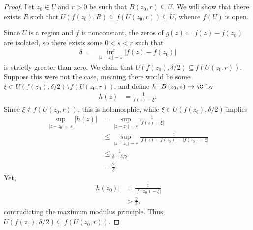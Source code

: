 \documentclass[10pt]{mypackage}
\begin{document}
\begin{proof}
  Let $z_0\in U$ and $r > 0$ be such that $ B\left( z_0,r \right)\subseteq U $. We will show that there exists $R$ such that $U\left( f\left( z_0 \right),R \right)\subseteq f\left( U\left( z_0,r \right) \right)\subseteq U$, whence $f(U)$ is open.\newline

  Since $U$ is a region and $f$ is nonconstant, the zeros of $g(z)\coloneq f(z) - f\left( z_0 \right)$ are isolated, so there exists some $0 < s < r$ such that
  \begin{align*}
    \delta &= \inf_{\left\vert z-z_0 \right\vert = s} \left\vert f(z)-f\left( z_0 \right) \right\vert
  \end{align*}
  is strictly greater than zero. We claim that $U\left( f\left( z_0 \right),\delta/2 \right) \subseteq f\left( U\left( z_0,r \right) \right)$. Suppose this were not the case, meaning there would be some $\xi\in U\left( f\left( z_0 \right),\delta/2 \right)\setminus f\left( U\left( z_0,r \right) \right)$, and define $ h\colon B\left( z_0,s \right)\rightarrow \C $ by
  \begin{align*}
    h(z) &= \frac{1}{f\left( z \right) - \xi}.
  \end{align*}
  Since $\xi\notin f\left( U\left( z_0,r \right) \right)$, this is holomorphic, while $\xi\in U\left( f\left( z_0 \right),\delta/2 \right)$ implies
  \begin{align*}
    \sup_{\left\vert z-z_0 \right\vert = s} \left\vert h(z) \right\vert &= \sup_{\left\vert z-z_0 \right\vert = s} \frac{1}{\left\vert f\left( z \right) - \xi \right\vert}\\
                                                                        &\leq \sup_{\left\vert z-z_0 \right\vert = s} \frac{1}{\left\vert f\left( z \right)-f\left( z_0 \right) \right\vert - \left\vert f\left( z_0 \right) - \xi \right\vert}\\
                                                                        &\leq \frac{1}{\delta - \delta/2}\\
                                                                        &= \frac{2}{\delta}.
  \end{align*}
  Yet,
  \begin{align*}
    \left\vert h\left( z_0 \right) \right\vert &= \frac{1}{\left\vert f\left( z_0 \right) - \xi \right\vert}\\
                                               &> \frac{2}{\delta},
  \end{align*}
  contradicting the maximum modulus principle. Thus, $U\left( f\left( z_0 \right),\delta/2 \right)\subseteq f\left( U\left( z_0,r \right) \right)$.
\end{proof}
\end{document}
